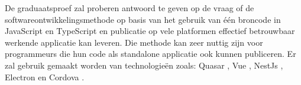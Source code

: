   De graduaatsproef zal proberen antwoord te geven op de vraag of de softwareontwikkelingsmethode op basis van het gebruik van één broncode in JavaScript en TypeScript \autocite{TSDoc} en publicatie op vele platformen effectief betrouwbaar werkende applicatie kan leveren. Die methode kan zeer nuttig zijn voor programmeurs die hun code als standalone applicatie ook kunnen publiceren. Er zal gebruik gemaakt worden van technologieën zoals: Quasar \autocite{QuasarStart}, Vue \autocite{VueDoc}, NestJs \autocite{NestJsDoc}, Electron \autocite{ElectronDoc} en Cordova \autocite{CordovaDoc}.